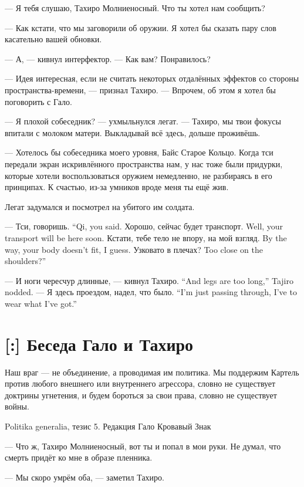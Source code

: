 --- Я тебя слушаю, Тахиро Молниеносный.
Что ты хотел нам сообщить?

--- Как кстати, что мы заговорили об оружии.
Я хотел бы сказать пару слов касательно вашей обновки.

--- А, --- кивнул интерфектор.
--- Как вам?
Понравилось?

--- Идея интересная, если не считать некоторых отдалённых эффектов со стороны пространства-времени, --- признал Тахиро.
--- Впрочем, об этом я хотел бы поговорить с Гало.

--- Я плохой собеседник? --- ухмыльнулся легат.
--- Тахиро, мы твои фокусы впитали с молоком матери.
Выкладывай всё здесь, дольше проживёшь.

--- Хотелось бы собеседника моего уровня, Байс Старое Кольцо.
Когда тси передали экран искривлённого пространства нам, у нас тоже были придурки, которые хотели воспользоваться оружием немедленно, не разбираясь в его принципах.
К счастью, из-за умников вроде меня ты ещё жив.

Легат задумался и посмотрел на убитого им солдата.

{--- Тси, говоришь.}
{``Qi, you said.}
{Хорошо, сейчас будет транспорт.}
{Well, your transport will be here soon.}
{Кстати, тебе тело не впору, на мой взгляд.}
{By the way, your body doesn't fit, I guess.}
{Узковато в плечах?}
{Too close on the shoulders?''}

{--- И ноги чересчур длинные, --- кивнул Тахиро.}
{``And legs are too long,'' Tajiro nodded.}
{--- Я здесь проездом, надел, что было.}
{``I'm just passing through, I've to wear what I've got.''}

\section{[:] Беседа Гало и Тахиро}

\epigraph
{Наш враг --- не объединение, а проводимая им политика.
Мы поддержим Картель против любого внешнего или внутреннего агрессора, словно не существует доктрины угнетения, и будем бороться за свои права, словно не существует войны.}
{Politika generalia, тезис 5.
Редакция Гало Кровавый Знак}

\textspace

--- Что ж, Тахиро Молниеносный, вот ты и попал в мои руки.
Не думал, что смерть придёт ко мне в образе пленника.

--- Мы скоро умрём оба, --- заметил Тахиро.

